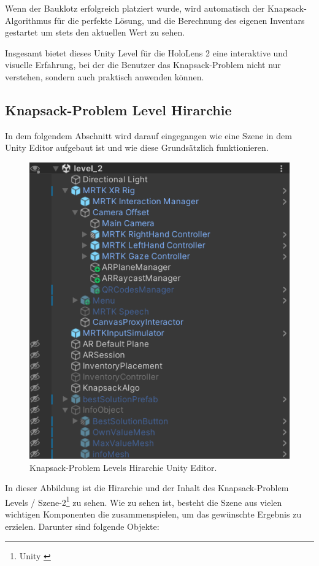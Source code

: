 Wenn der Bauklotz erfolgreich platziert wurde, wird automatisch der Knapsack-Algorithmus für die perfekte Lösung,
und die Berechnung des eigenen Inventars gestartet um stets den aktuellen Wert zu sehen.

Insgesamt bietet dieses Unity Level für die HoloLens 2 eine interaktive und visuelle Erfahrung,
bei der die Benutzer das Knapsack-Problem nicht nur verstehen, sondern auch praktisch anwenden können.

\subsection{Knapsack-Problem Level Hirarchie}
In dem folgendem Abschnitt wird darauf eingegangen wie eine Szene in dem Unity Editor aufgebaut ist und wie diese Grundsätzlich
funktionieren.\\

\begin{figure}[H]
    \centering
    \includegraphics[scale=0.8]{images/Level2Hirarchy}
    \caption{Knapsack-Problem Levels Hirarchie Unity Editor.}
    \label{fig:level2_hierarchy}
\end{figure}

In dieser Abbildung ist die Hirarchie und der Inhalt des Knapsack-Problem Levels / Szene-2\footnote{Unity \cite{Scene}} zu sehen.
Wie zu sehen ist, besteht die Szene aus vielen wichtigen Komponenten die zusammenspielen, um das gewünschte Ergebnis
zu erzielen. Darunter sind folgende Objekte:

